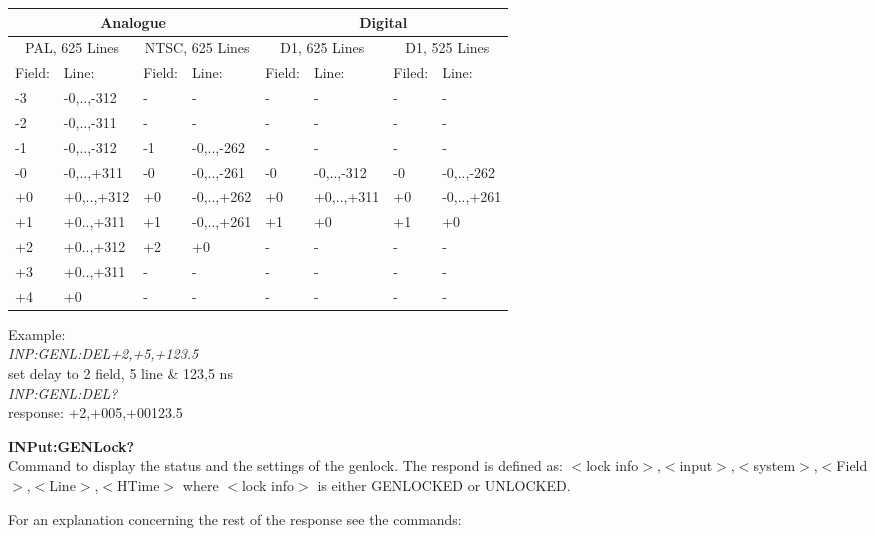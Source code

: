 \begin{tabular}{|l|l|l|l|l|l|l|l|}
\hline
\multicolumn{4}{|c|}{Analogue} & \multicolumn{4}{|c|}{Digital} \\ 
\hline
\multicolumn{2}{|c|}{PAL, 625 Lines} & \multicolumn{2}{|c|}{NTSC, 625 Lines} & \multicolumn{2}{|c|}{D1, 625 Lines} & \multicolumn{2}{|c|}{D1, 525 Lines} \\ 
\hline
Field: 	& Line: 			& Field: 				& Line: 			& Field:	& Line:			 	& Filed: 	& Line: \\ \hline
-3 			& -0,..,-312	& -							& -						& -				& -						& -				& - \\ \hline
-2			& -0,..,-311	& -							& -						& -				& -						& -				& - \\ \hline
-1			& -0,..,-312	& -1 						& -0,..,-262	& -				& -						& -				& -  \\ \hline
-0			& -0,..,+311	& -0 						& -0,..,-261	& -0			& -0,..,-312	& -0			& -0,..,-262 \\ \hline
+0			& +0,..,+312	& +0						& -0,..,+262	& +0			& +0,..,+311	& +0			&	-0,..,+261 \\ \hline
+1			& +0..,+311		& +1						& -0,..,+261	& +1			& +0					& +1			& +0  \\ \hline
+2			& +0..,+312		& +2						& +0					& -				& -						& -				& - \\ \hline
+3			& +0..,+311		& -							& -						& -				& -						& -				& - \\ \hline
+4			& +0					& -							& -						& -				& -						& -				& - \\ \hline
\end{tabular}

Example:\\
\textit{INP:GENL:DEL+2,+5,+123.5}\\
set delay to 2 field, 5 line \& 123,5 ns\\
\textit{INP:GENL:DEL?}\\
response: +2,+005,+00123.5

\textbf{INPut:GENLock?}\\
Command to display the status and the settings of the genlock. The respond is defined as:
$<$lock info$>$,$<$input$>$,$<$system$>$,$<$Field$>$,$<$Line$>$,$<$HTime$>$ where $<$lock info$>$ is either GENLOCKED or UNLOCKED. 

For an explanation concerning the rest of the response see the commands: 

